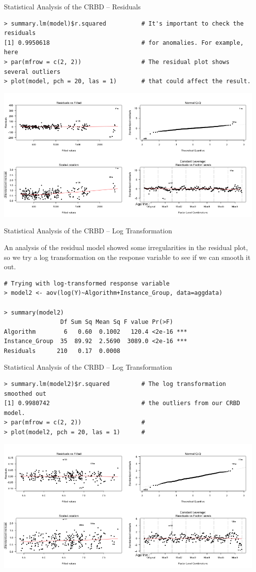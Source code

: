 \begin{frame}[fragile]{Statistical Analysis of the CRBD -- Residuals}

{\smaller
\begin{verbatim}
> summary.lm(model)$r.squared          # It's important to check the residuals
[1] 0.9950618                          # for anomalies. For example, here
> par(mfrow = c(2, 2))                 # The residual plot shows several outliers
> plot(model, pch = 20, las = 1)       # that could affect the result.
\end{verbatim}}
\centering\includegraphics[width=.7\textwidth]{../img/algo_res1.png}
\end{frame}

\begin{frame}[fragile]{Statistical Analysis of the CRBD -- Log Transformation}

An analysis of the residual model showed some irregularities in the
residual plot, so we try a log transformation on the response variable
to see if we can smooth it out.

{\smaller
\begin{verbatim}
# Trying with log-transformed response variable
> model2 <- aov(log(Y)~Algorithm+Instance_Group, data=aggdata)

> summary(model2)
                Df Sum Sq Mean Sq F value Pr(>F)
Algorithm        6   0.60  0.1002   120.4 <2e-16 ***
Instance_Group  35  89.92  2.5690  3089.0 <2e-16 ***
Residuals      210   0.17  0.0008
\end{verbatim}
}
\end{frame}

\begin{frame}[fragile]{Statistical Analysis of the CRBD -- Log Transformation}

{\smaller
\begin{verbatim}
> summary.lm(model2)$r.squared         # The log transformation smoothed out
[1] 0.9980742                          # the outliers from our CRBD model.
> par(mfrow = c(2, 2))                 #
> plot(model2, pch = 20, las = 1)      #
\end{verbatim}}
\centering\includegraphics[width=.7\textwidth]{../img/algo_res2.png}
\end{frame}

